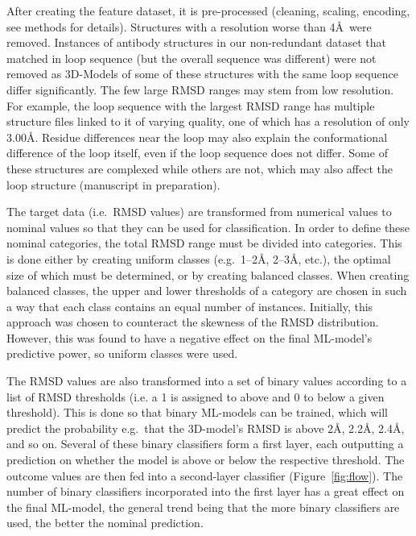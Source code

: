 \documentclass[12pt]{article}
\begin{document}
After creating the feature dataset, it is pre-processed (cleaning,
scaling, encoding, see methods for details). Structures with a
resolution worse than 4\AA\ were removed.
Instances of antibody structures in our non-redundant dataset that matched in loop sequence (but the overall sequence was different) were
not removed as 3D-Models of some of these structures with the same loop
sequence differ significantly. 
The few large RMSD ranges may stem from
low resolution. For example, the loop sequence with the largest RMSD range 
has multiple structure files linked to it of varying quality, one of which has a resolution of only 3.00\AA. Residue differences near the loop may also
explain the conformational difference of the loop itself, 
even if the loop sequence does not differ. Some of these structures are
complexed while others are not, which may also affect the loop
structure (manuscript in preparation).


The target data (i.e.\ RMSD values) are transformed from numerical
values to nominal values so that they can be used for
classification. In order to define these nominal categories, the total
RMSD range must be divided into categories. This is done either by
creating uniform classes (e.g.\ 1--2\AA, 2--3\AA, etc.), the optimal size of which
must be determined, or by creating balanced classes. When
creating balanced classes, the upper and lower thresholds of a
category are chosen in such a way that each class contains an equal
number of instances. Initially, this approach was chosen to counteract the
skewness of the RMSD distribution. However, this was found to
have a negative effect on the final ML-model's predictive power, so
uniform classes were used.

The RMSD values are also transformed into a set of binary values according to a
list of RMSD thresholds (i.e. a 1 is assigned to above and 0 to below a given threshold). This is done so that binary ML-models can be
trained, which will predict the probability e.g.\ that the 3D-model's RMSD
is above 2\AA, 2.2\AA, 2.4\AA, and so on. Several of these binary classifiers form a first layer, each outputting a prediction on whether the model is above or below the respective threshold. The outcome values are then fed into a second-layer classifier (Figure~\ref{fig:flow}). The number of binary
classifiers incorporated into the first layer has a great effect on
the final ML-model, the general trend being that the more binary
classifiers are used, the better the nominal prediction. 
\end{document}
